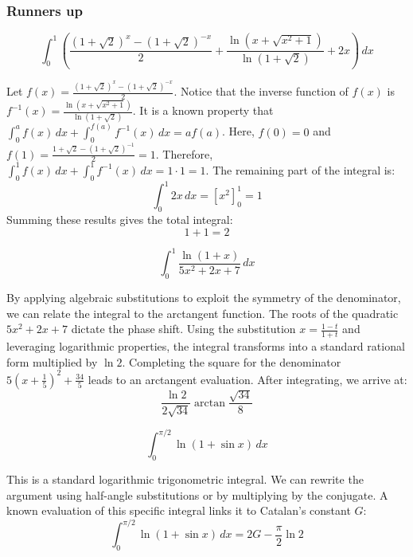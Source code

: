 \subsubsection*{Runners up}
\begin{questions}
    \question
    \[ \int_{0}^{1} \left( \frac{(1 + \sqrt{2})^x - (1 + \sqrt{2})^{-x}}{2} + \frac{\ln(x + \sqrt{x^2 + 1})}{\ln(1 + \sqrt{2})} + 2x \right) \, dx \]
    \begin{solution}
        Let $f(x) = \frac{(1 + \sqrt{2})^x - (1 + \sqrt{2})^{-x}}{2}$. 
        Notice that the inverse function of $f(x)$ is $f^{-1}(x) = \frac{\ln(x + \sqrt{x^2 + 1})}{\ln(1 + \sqrt{2})}$.
        It is a known property that $\int_{0}^{a} f(x) \, dx + \int_{0}^{f(a)} f^{-1}(x) \, dx = a f(a)$.
        Here, $f(0) = 0$ and $f(1) = \frac{1 + \sqrt{2} - (1 + \sqrt{2})^{-1}}{2} = 1$.
        Therefore, $\int_{0}^{1} f(x) \, dx + \int_{0}^{1} f^{-1}(x) \, dx = 1 \cdot 1 = 1$.
        The remaining part of the integral is:
        \[ \int_{0}^{1} 2x \, dx = \left[ x^2 \right]_{0}^{1} = 1 \]
        Summing these results gives the total integral:
        \[ 1 + 1 = 2 \]
    \end{solution}

    \question
    \[ \int_{0}^{1} \frac{\ln(1 + x)}{5x^2 + 2x + 7} \, dx \]
    \begin{solution}
        By applying algebraic substitutions to exploit the symmetry of the denominator, we can relate the integral to the arctangent function. The roots of the quadratic $5x^2 + 2x + 7$ dictate the phase shift. 
        Using the substitution $x = \frac{1-t}{1+t}$ and leveraging logarithmic properties, the integral transforms into a standard rational form multiplied by $\ln 2$. 
        Completing the square for the denominator $5(x + \frac{1}{5})^2 + \frac{34}{5}$ leads to an arctangent evaluation. After integrating, we arrive at:
        \[ \frac{\ln 2}{2\sqrt{34}} \arctan \frac{\sqrt{34}}{8} \]
    \end{solution}

    \question
    \[ \int_{0}^{\pi/2} \ln(1 + \sin x) \, dx \]
    \begin{solution}
        This is a standard logarithmic trigonometric integral. We can rewrite the argument using half-angle substitutions or by multiplying by the conjugate.
        A known evaluation of this specific integral links it to Catalan's constant $G$:
        \[ \int_{0}^{\pi/2} \ln(1 + \sin x) \, dx = 2G - \frac{\pi}{2} \ln 2 \]
    \end{solution}


\end{questions}
